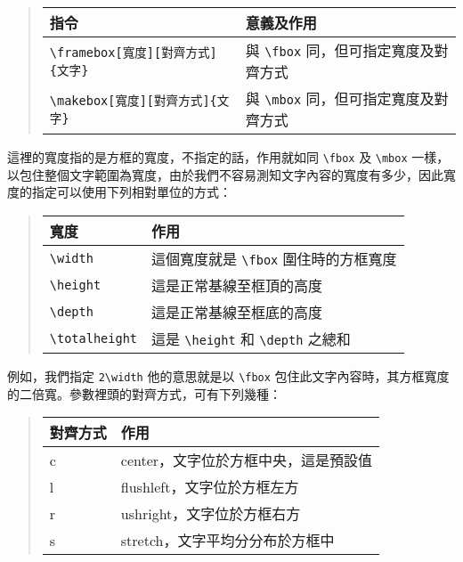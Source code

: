 \begin{quote}
   \begin{tabular}{ll}
      指令                     & 意義及作用                                             \\
      \hline
      \verb|\framebox[寬度][對齊方式]{文字}| & 與 \verb|\fbox| 同，但可指定寬度及對齊方式 \\
      \verb|\makebox[寬度][對齊方式]{文字}| & 與 \verb|\mbox| 同，但可指定寬度及對齊方式
      \index{framebox@\verb=\framebox=}\index{makebox@\verb=\makebox=}
   \end{tabular}
\end{quote}

這裡的寬度指的是方框的寬度，不指定的話，作用就如同 \verb|\fbox| 及 \verb|\mbox| 一樣，以包住整個文字範圍為寬度，由於我們不容易測知文字內容的寬度有多少，因此寬度的指定可以使用下列相對單位的方式：

\begin{quote}
   \begin{tabular}{ll}
      寬度                     & 作用                                                             \\
      \hline
      \verb|\width| & 這個寬度就是 \verb|\fbox| 圍住時的方框寬度           \\
      \verb|\height| & 這是正常基線至框頂的高度                                         \\
      \verb|\depth| & 這是正常基線至框底的高度                                         \\
      \verb|\totalheight| & 這是 \verb|\height| 和 \verb|\depth| 之總和 \\
   \end{tabular}
\end{quote}

例如，我們指定 \verb|2\width| 他的意思就是以 \verb|\fbox| 包住此文字內容時，其方框寬度的二倍寬。參數裡頭的對齊方式，可有下列幾種：

\begin{quote}
   \begin{tabular}{>{\ttfamily }ll}
      對齊方式 & 作用                                 \\
      \hline
      c        & center，文字位於方框中央，這是預設值 \\
      l        & flushleft，文字位於方框左方          \\
      r        & ushright，文字位於方框右方           \\
      s        & stretch，文字平均分分布於方框中
   \end{tabular}
\end{quote}

